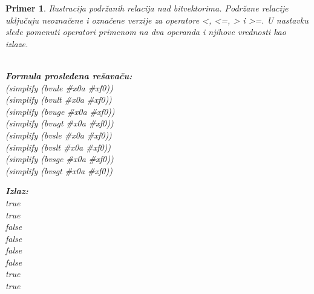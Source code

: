 \documentclass[12pt,oneside]{memoir}
\newtheorem{primer}{Primer}
\begin{document}
\begin{primer} Ilustracija podržanih relacija nad bitvektorima. Podržane relacije uključuju neoznačene i označene verzije za operatore <, <=, > i >=. U nastavku slede pomenuti operatori primenom na dva operanda i njihove vrednosti kao izlaze.
\\ \\ 
\begin{minipage}[b]{0.5\textwidth}
\textbf{Formula prosleđena rešavaču:}
\\(simplify (bvule \#x0a \#xf0))  
\\(simplify (bvult \#x0a \#xf0))  
\\(simplify (bvuge \#x0a \#xf0))  
\\(simplify (bvugt \#x0a \#xf0))  
\\(simplify (bvsle \#x0a \#xf0)) 
\\(simplify (bvslt \#x0a \#xf0))  
\\(simplify (bvsge \#x0a \#xf0))  
\\(simplify (bvsgt \#x0a \#xf0))

\end{minipage}
\hspace{2cm} 
\begin{minipage}[t]{0.5\textwidth}
\vspace{-5.3cm}
\textbf{Izlaz:}
\\true 
\\true 
\\false 
\\false 
\\false 
\\false 
\\true 
\\true
\end{minipage}


\end{primer}
\end{document}
